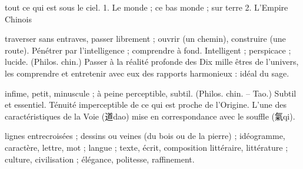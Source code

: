 \begin{Def}[tianxia 天下]
    tout ce qui est sous le ciel. 1. Le monde ; ce bas monde ; sur terre 2. L’Empire Chinois
\end{Def}
\begin{Def}[tong 通]
    traverser sans entraves, passer librement ; ouvrir (un chemin), construire (une route).     Pénétrer par l’intelligence ; comprendre à fond. Intelligent ; perspicace ; lucide.     (Philos. chin.) Passer à la réalité profonde des Dix mille êtres de l’univers, les comprendre et entretenir avec eux des rapports harmonieux : idéal du sage.
\end{Def}
\begin{Def}[wei 微]
    infime, petit, minuscule ; à peine perceptible, subtil. (Philos. chin. – Tao.) Subtil et essentiel. Ténuité imperceptible de ce qui est proche de l’Origine. L’une des caractéristiques de la Voie (道dao) mise en correspondance avec le souffle (氣qi). 
\end{Def}

\begin{Def}[wen 文]
    lignes entrecroisées ; dessins ou veines (du bois ou de la pierre) ; idéogramme, caractère, lettre, mot ; langue ; texte, écrit, composition littéraire, littérature ; culture, civilisation ; élégance, politesse, raffinement. 
\end{Def}


